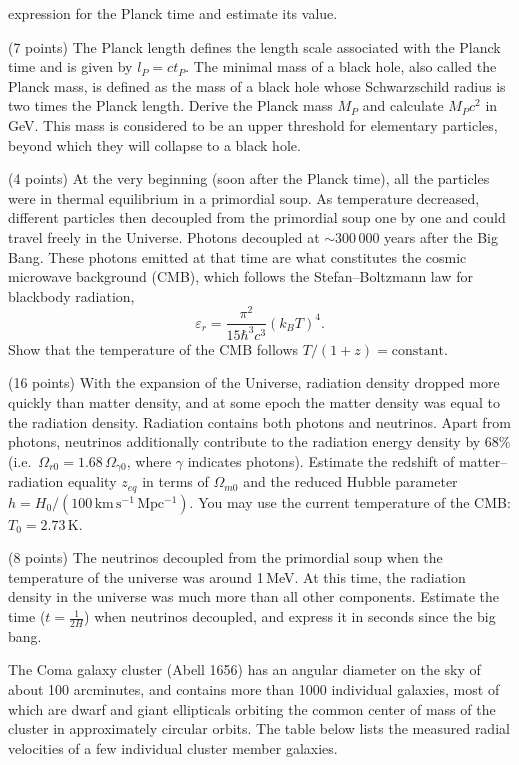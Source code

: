 \begin{description}
  expression for the Planck time and estimate its value.
\item[(g)] (7 points) The Planck length defines the length scale associated
  with the Planck time and is given by $l_P = ct_P$. The minimal mass of a
  black hole, also called the Planck mass, is defined as the mass of a black
  hole whose Schwarzschild radius is two times the Planck length. Derive the
  Planck mass $M_P$ and calculate $M_P c^2$ in GeV. This mass is considered to
  be an upper threshold for elementary particles, beyond which they will
  collapse to a black hole.
\item[(h)] (4 points) At the very beginning (soon after the Planck time), all
  the particles were in thermal equilibrium in a primordial soup. As
  temperature decreased, different particles then decoupled from the
  primordial soup one by one and could travel freely in the Universe. Photons
  decoupled at ${\sim}300\,000$ years after the Big Bang. These photons
  emitted at that time are what constitutes the cosmic microwave background
  (CMB), which follows the Stefan--Boltzmann law for blackbody radiation,
  \[ \varepsilon_r = \frac{\pi^2}{15\hbar^3 c^3}(k_B T)^4. \]
  Show that the temperature of the CMB follows $T/(1+z) = \mathrm{constant}$.
\item[(i)] (16 points) With the expansion of the Universe, radiation density
  dropped more quickly than matter density, and at some epoch the matter
  density was equal to the radiation density. Radiation contains both photons
  and neutrinos. Apart from photons, neutrinos additionally contribute to the
  radiation energy density by 68\% (i.e.\
  $\Omega_{r0} = 1.68\,\Omega_{\gamma 0}$, where $\gamma$ indicates photons).
  Estimate the redshift of matter--radiation equality $z_{eq}$ in terms of
  $\Omega_{m0}$ and the reduced Hubble parameter
  $h = H_0/(100\,\mathrm{km\,s^{-1}\,Mpc^{-1}})$. You may use the current
  temperature of the CMB: $T_0 = 2.73$\,K.
\item[(j)] (8 points) The neutrinos decoupled from the primordial soup when
  the temperature of the universe was around 1\,MeV. At this time, the
  radiation density in the universe was much more than all other components.
  Estimate the time ($t = \frac{1}{2H}$) when neutrinos decoupled, and express
  it in seconds since the big bang.
\end{description}

The Coma galaxy cluster (Abell 1656) has an angular diameter on the sky of
about 100 arcminutes, and contains more than 1000 individual galaxies, most of
which are dwarf and giant ellipticals orbiting the common center of mass of
the cluster in approximately circular orbits. The table below lists the
measured radial velocities of a few individual cluster member galaxies.

